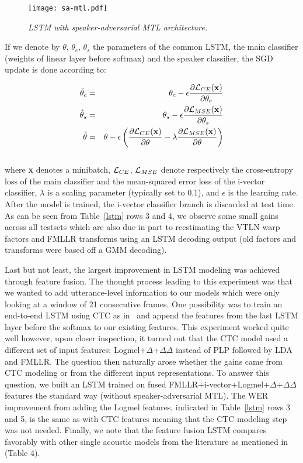 \documentclass[a4paper]{article}
\begin{document}
\begin{figure}[htpb]
 \begin{center}
   \texttt{[image: sa-mtl.pdf]}
       \caption{{\it LSTM with speaker-adversarial MTL architecture.}}
       \label{sa-mtl}
  \end{center}
\end{figure}

If we denote by $\theta$, $\theta_c$, $\theta_s$ the parameters of the common LSTM, the main classifier (weights of linear layer before softmax) and the speaker classifier, the SGD update is done according to:

\begin{eqnarray*}
 \hat{\theta}_c &=& \theta_c-\epsilon\frac{\partial{\cal
      L}_{CE}({\bf x})}{\partial\theta_c}\\
 \hat{\theta}_s &=& \theta_s-\epsilon\frac{\partial{\cal
      L}_{MSE}({\bf x})}{\partial\theta_s}\\
 \hat{\theta} &=& \theta-\epsilon\left(\frac{\partial{\cal
      L}_{CE}({\bf x})}{\partial\theta}-\lambda\frac{\partial{\cal
      L}_{MSE}({\bf x})}{\partial\theta}\right) 
\end{eqnarray*}
~~\\
where {\bf x} denotes a minibatch, ${\cal L}_{CE}$, ${\cal L}_{MSE}$ denote respectively the
cross-entropy loss of the main classifier and the mean-squared error
loss of the i-vector classifier, $\lambda$ is a scaling parameter
(typically set to 0.1), and $\epsilon$ is the learning rate. After the
model is trained, the i-vector classifier branch is discarded at test
time. As can be seen from Table~\ref{lstm} rows 3 and 4, we observe
some small gains across all testsets which are also due in part to
reestimating the VTLN warp factors and FMLLR transforms using an LSTM
decoding output (old factors and transforms were based off a GMM
decoding).

Last but not least, the largest improvement in LSTM modeling was
achieved through feature fusion. The thought process leading to this
experiment was that we wanted to add utterance-level information to
our models which were only looking at a window of 21 consecutive
frames. One possibility was to train an end-to-end LSTM using CTC as
in~\cite{miao15,sak15,soltau16,liu17} and append the features from the
last LSTM layer before the softmax to our existing features. This
experiment worked quite well however, upon closer inspection, it
turned out that the CTC model used a different set of input features:
Logmel+$\Delta$+$\Delta\Delta$ instead of PLP followed by LDA and
FMLLR. The question then naturally arose whether the gains came from
CTC modeling or from the different input representations. To answer
this question, we built an LSTM trained on fused
FMLLR+i-vector+Logmel+$\Delta$+$\Delta\Delta$ features the standard
way (without speaker-adversarial MTL). The WER improvement from adding the
Logmel features, indicated in Table~\ref{lstm} rows 3 and 5, is the
same as with CTC features meaning that the CTC modeling step was not
needed. Finally, we note that the feature fusion LSTM compares
favorably with other single acoustic models from the literature as
mentioned in~\cite{liu17} (Table 4).
\end{document}
